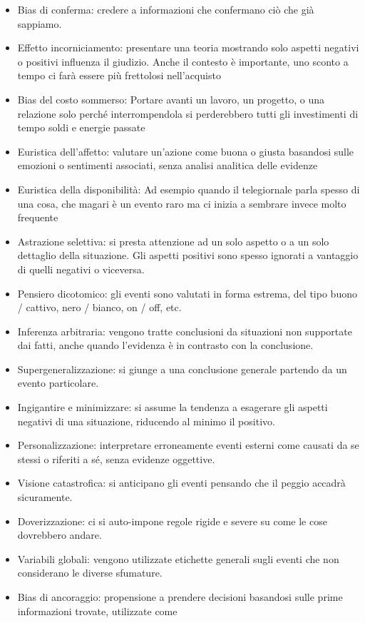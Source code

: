 \documentclass[12pt]{book} %
\begin{document}
\begin{itemize}
\item Bias di conferma: credere a informazioni che confermano ciò che già sappiamo.
\item Effetto incorniciamento: presentare una teoria mostrando solo aspetti negativi o positivi influenza il giudizio.
Anche il contesto è importante, uno sconto a tempo ci farà essere più frettolosi nell'acquisto 
\item Bias del costo sommerso: Portare avanti un lavoro, un progetto, o una relazione solo perché interrompendola si
perderebbero tutti gli investimenti di tempo soldi e energie passate
\item Euristica dell'affetto: valutare un’azione come buona o giusta basandosi sulle emozioni o sentimenti associati, senza analisi analitica delle evidenze
\item Euristica della disponibilità: Ad esempio quando il telegiornale parla spesso di una cosa, che magari è un evento
raro ma ci inizia a sembrare invece molto frequente 
\item Astrazione selettiva: si presta attenzione ad un solo aspetto o a un solo dettaglio della situazione. Gli aspetti
positivi sono spesso ignorati a vantaggio di quelli negativi o viceversa.
\item Pensiero dicotomico: gli eventi sono valutati in forma estrema, del tipo buono / cattivo, nero / bianco, on / off,
etc.
\item Inferenza arbitraria: vengono tratte conclusioni da situazioni non supportate dai fatti, anche quando
l'evidenza è in contrasto con la conclusione.
\item Supergeneralizzazione: si giunge a una conclusione generale partendo da un evento particolare.
\item Ingigantire e minimizzare: si assume la tendenza a esagerare gli aspetti negativi di una situazione, riducendo al
minimo il positivo.
\item Personalizzazione: interpretare erroneamente eventi esterni come causati da se stessi o riferiti a sé, senza evidenze oggettive.
\item Visione catastrofica: si anticipano gli eventi pensando che il peggio accadrà sicuramente.
\item Doverizzazione: ci si auto-impone regole rigide e severe su come le cose dovrebbero andare.
\item Variabili globali: vengono utilizzate etichette generali sugli eventi che non considerano le diverse sfumature.
\item Bias di ancoraggio: propensione a prendere decisioni basandosi sulle prime informazioni trovate, utilizzate come

\end{itemize}
\end{document}
